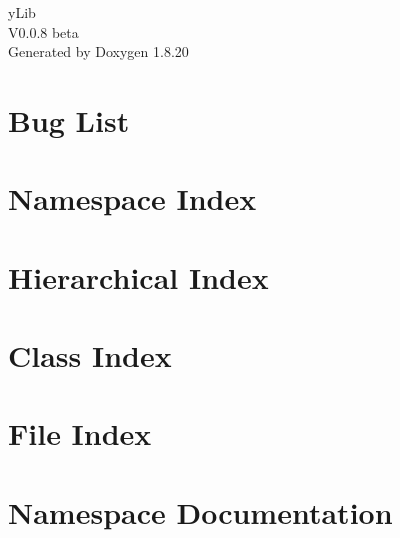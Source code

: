 \let\mypdfximage\pdfximage\def\pdfximage{\immediate\mypdfximage}\documentclass[twoside]{book}
\newcommand{\+}{\discretionary{\mbox{\scriptsize$\hookleftarrow$}}{}{}}
\newcommand{\clearemptydoublepage}{%
  \newpage{\pagestyle{empty}\cleardoublepage}%
}
\begin{document}
\hypersetup{pageanchor=false,
             bookmarksnumbered=true,
             pdfencoding=unicode
            }
\begin{titlepage}
\vspace*{7cm}
\begin{center}%
{\Large y\+Lib \\[1ex]\large V0.\+0.\+8 beta }\\
\vspace*{1cm}
{\large Generated by Doxygen 1.8.20}\\
\end{center}
\end{titlepage}
\clearemptydoublepage
{}
\tableofcontents
\clearemptydoublepage
{}
\hypersetup{pageanchor=true}

\chapter{Bug List}
\label{bug}

\chapter{Namespace Index}

\chapter{Hierarchical Index}

\chapter{Class Index}

\chapter{File Index}

\chapter{Namespace Documentation}

\end{document}
